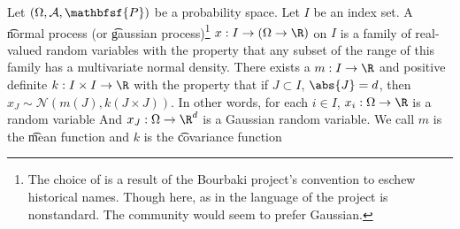 

Let $(\Omega, \mathcal{A}, \mathbfsf{P})$ be a probability space.
Let $I$ be an index set.
A \t{normal process} (or \t{gaussian process})\footnote{The choice of  is a result of the Bourbaki project's convention to eschew historical names. Though here, as in  the language of the project is nonstandard. The community would seem to prefer Gaussian.} $x: I \to (\Omega \to \R)$ on $I$ is a family of real-valued random variables with the property that any subset of the range of this family has a multivariate normal density.
There exists a $m: I \to \R$ and positive definite $k: I \times I \to \R$ with the property that if $J \subset I$, $\abs{J} = d$, then $x_J \sim \mathcal{N}(m(J), k(J \times J))$.
In other words, for each $i \in I$, $x_i: \Omega \to \R$ is a random variable
And $x_J: \Omega \to \R^d$ is a Gaussian random variable.
We call $m$ is the \t{mean function} and $k$ is the \t{covariance function}

\blankpage
